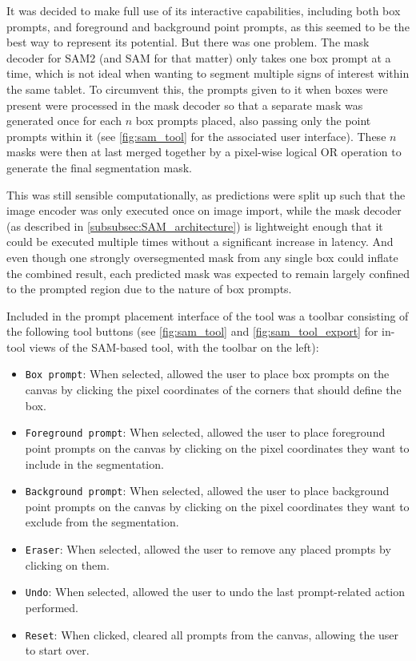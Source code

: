 It was decided to make full use of its interactive capabilities, including both box prompts, and foreground and background point prompts, as this seemed to be the best way to represent its potential.
But there was one problem.
The mask decoder for \acs{SAM}2 (and \acs{SAM} for that matter) only takes one box prompt at a time, which is not ideal when wanting to segment multiple signs of interest within the same tablet.
To circumvent this, the prompts given to it when boxes were present were processed in the mask decoder so that a separate mask was generated once for each $n$ box prompts placed, also passing only the point prompts within it (see \cref{fig:sam_tool} for the associated user interface).
These $n$ masks were then at last merged together by a pixel-wise logical OR operation to generate the final segmentation mask.

This was still sensible computationally, as predictions were split up such that the image encoder was only executed once on image import, while the mask decoder (as described in \cref{subsubsec:SAM_architecture}) is lightweight enough that it could be executed multiple times without a significant increase in latency.
And even though one strongly oversegmented mask from any single box could inflate the combined result, each predicted mask was expected to remain largely confined to the prompted region due to the nature of box prompts.

Included in the prompt placement interface of the tool was a toolbar consisting of the following tool buttons (see \cref{fig:sam_tool} and \cref{fig:sam_tool_export} for in-tool views of the SAM-based tool, with the toolbar on the left):
\begin{itemize}
    \item \texttt{Box prompt}: When selected, allowed the user to place box prompts on the canvas by clicking the pixel coordinates of the corners that should define the box.
    \item \texttt{Foreground prompt}: When selected, allowed the user to place foreground point prompts on the canvas by clicking on the pixel coordinates they want to include in the segmentation.
    \item \texttt{Background prompt}: When selected, allowed the user to place background point prompts on the canvas by clicking on the pixel coordinates they want to exclude from the segmentation.
    \item \texttt{Eraser}: When selected, allowed the user to remove any placed prompts by clicking on them.
    \item \texttt{Undo}: When selected, allowed the user to undo the last prompt-related action performed.
    \item \texttt{Reset}: When clicked, cleared all prompts from the canvas, allowing the user to start over.
\end{itemize}

